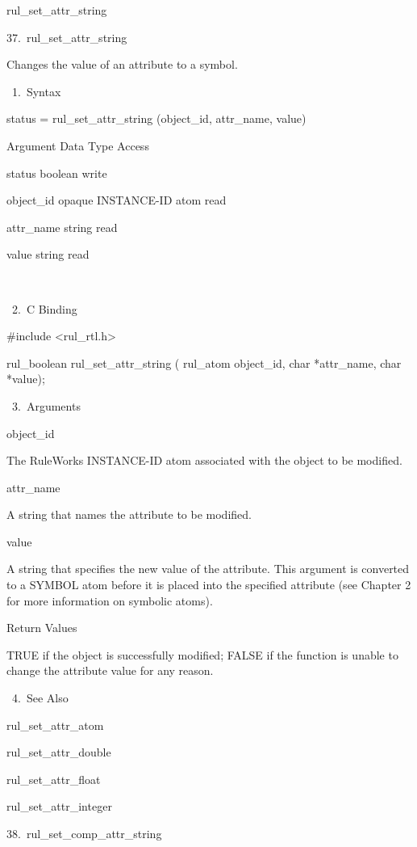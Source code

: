 {    rul_set_attr_string

37. rul_set_attr_string

    Changes the value of an attribute to a
    symbol.

       1. Syntax

          status = rul_set_attr_string
          (object_id, attr_name, value)

          Argument  Data Type     Access

          status  boolean     write

          object_id  opaque INSTANCE-ID atom
           read

          attr_name  string     read

          value  string     read

           

       2. C Binding

          #include <rul_rtl.h>

          rul_boolean rul_set_attr_string (
          rul_atom object_id,
          char *attr_name,
          char *value);

       3. Arguments

          object_id

          The RuleWorks INSTANCE-ID atom
          associated with the object to be
          modified.

          attr_name

          A string that names the attribute to
          be modified.

          value

          A string that specifies the new
          value of the attribute. This
          argument is converted to a SYMBOL
          atom before it is placed into the
          specified attribute (see Chapter 2
          for more information on symbolic
          atoms).

          Return Values

          TRUE if the object is successfully
          modified; FALSE if the function is
          unable to change the attribute value
          for any reason.

       4. See Also

    rul_set_attr_atom

    rul_set_attr_double

    rul_set_attr_float

    rul_set_attr_integer

38. rul_set_comp_attr_string

}
